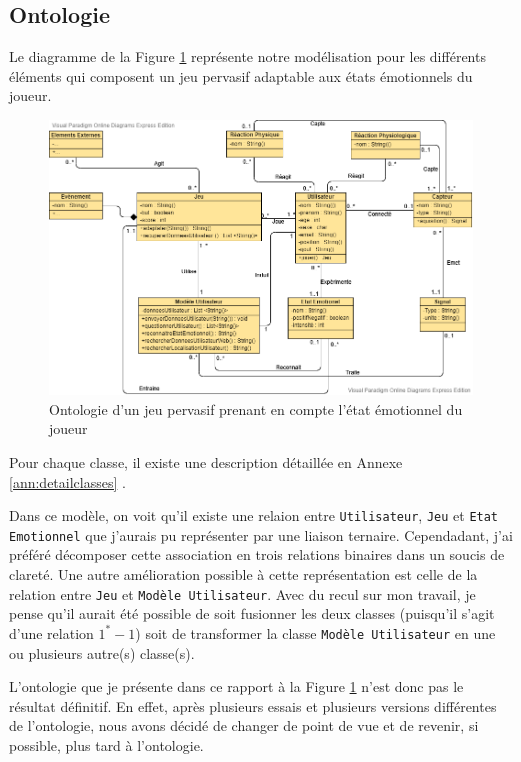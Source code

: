 \documentclass{article}
\begin{document}
	\subsection{Ontologie}
		Le diagramme de la Figure \ref{fig:modele} représente notre modélisation pour les différents éléments qui composent un jeu pervasif adaptable aux états émotionnels du joueur. 
		\begin{figure}
			\centering
			\includegraphics[scale=0.5]{../include/ontologie_stage_cnam-v2-5.png}
			\caption{Ontologie d'un jeu pervasif prenant en compte l'état émotionnel du joueur}
			\label{fig:modele}
		\end{figure}
		Pour chaque classe, il existe une description détaillée en Annexe \ref{ann:detailclasses}
		.\par
		Dans ce modèle, on voit qu'il existe une relaion entre \texttt{Utilisateur}, \texttt{Jeu} et \texttt{Etat Emotionnel} que j'aurais pu représenter par une liaison ternaire.
		Cependadant, j'ai préféré décomposer cette association en trois relations binaires dans un soucis de clareté. 
		Une autre amélioration possible à cette représentation est celle de la relation entre \texttt{Jeu} et \texttt{Modèle Utilisateur}. 
		Avec du recul sur mon travail, je pense qu'il aurait été possible de soit fusionner les deux classes (puisqu'il s'agit d'une relation $1^* - 1$) soit de transformer la classe \texttt{Modèle Utilisateur} en une ou plusieurs autre(s) classe(s).\par
		L'ontologie que je présente dans ce rapport à la Figure \ref{fig:modele} n'est donc pas le résultat définitif.
		En effet, après plusieurs essais et plusieurs versions différentes de l'ontologie, nous avons décidé de changer de point de vue et de revenir, si possible, plus tard à l'ontologie.
\end{document}
